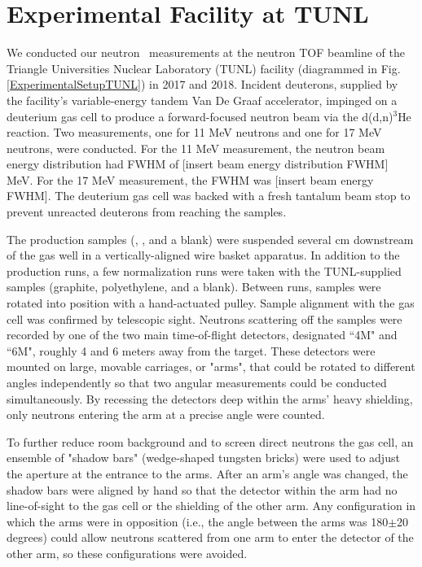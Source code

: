 \section{Experimental Facility at TUNL}
We conducted our neutron \el\ measurements at the neutron TOF
beamline of the Triangle Universities Nuclear Laboratory (TUNL) facility
(diagrammed in Fig. \ref{ExperimentalSetupTUNL}) in 2017 and 2018.
Incident deuterons, supplied by the
facility's variable-energy tandem Van De Graaf accelerator, impinged on a deuterium
gas cell to produce a forward-focused neutron beam via the d(d,n)$^{3}$He reaction.
Two measurements, one for 11 MeV neutrons and one for 17 MeV neutrons, were
conducted. For the 11 MeV measurement, the neutron beam energy distribution
had FWHM of [insert beam energy distribution FWHM] MeV. For the 17 MeV
measurement, the FWHM was [insert beam energy FWHM]. The deuterium gas cell
was backed with a fresh tantalum beam stop to prevent unreacted deuterons from
reaching the samples. 

The production samples (\snTwelve, \snFour, and a blank) were suspended several
cm downstream of the gas well in a vertically-aligned wire basket apparatus.
In addition to the production runs, a few normalization runs were taken
with the TUNL-supplied samples (graphite, polyethylene, and a blank).
Between runs, samples were rotated into position
with a hand-actuated pulley. Sample alignment with the gas cell was confirmed
by telescopic sight. Neutrons scattering off the samples were recorded by one
of the two main time-of-flight
detectors, designated ``4M" and ``6M", roughly 4 and 6 meters away from the target.
These detectors were mounted on large, movable carriages, or "arms",
that could be rotated to different angles independently so that two angular
measurements could be conducted simultaneously. By recessing the detectors deep within
the arms' heavy shielding, only neutrons entering the arm at a precise angle
were counted.

To further reduce room background and to screen direct neutrons the gas cell,
an ensemble of "shadow bars" (wedge-shaped tungsten bricks)
were used to adjust the aperture at the entrance to the arms. After an arm's
angle was changed, the shadow bars were aligned by hand so that the
detector within the arm had no line-of-sight to the gas cell or the
shielding of the other arm. Any configuration in which the arms were in opposition (i.e., the
angle between the arms was 180$\pm$20 degrees) could allow neutrons scattered
from one arm to enter the detector of the other arm, so these configurations were avoided.

